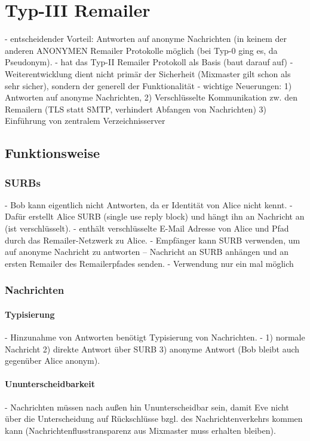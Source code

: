 \chapter{Typ-III Remailer}
- entscheidender Vorteil: Antworten auf anonyme Nachrichten (in keinem der anderen ANONYMEN Remailer Protokolle möglich (bei Typ-0 ging es, da Pseudonym).
- hat das Typ-II Remailer Protokoll als Basis (baut darauf auf)
- Weiterentwicklung dient nicht primär der Sicherheit (Mixmaster gilt schon als sehr sicher), sondern der generell der Funktionalität
- wichtige Neuerungen: 1) Antworten auf anonyme Nachrichten, 2) Verschlüsselte Kommunikation zw. den Remailern (TLS statt SMTP, verhindert Abfangen von Nachrichten) 3) Einführung von zentralem Verzeichnisserver

\section{Funktionsweise}
\subsection{SURBs}
- Bob kann eigentlich nicht Antworten, da er Identität von Alice nicht kennt.
- Dafür erstellt Alice SURB (single use reply block) und hängt ihn an Nachricht an (ist verschlüsselt).
- enthält verschlüsselte E-Mail Adresse von Alice und Pfad durch das Remailer-Netzwerk zu Alice.
- Empfänger kann SURB verwenden, um auf anonyme Nachricht zu antworten
-- Nachricht an SURB anhängen und an ersten Remailer des Remailerpfades senden.
- Verwendung nur ein mal möglich

\subsection{Nachrichten}
\subsubsection{Typisierung}
- Hinzunahme von Antworten benötigt Typisierung von Nachrichten.
- 1) normale Nachricht 2) direkte Antwort über SURB 3) anonyme Antwort (Bob bleibt auch gegenüber Alice anonym).

\subsubsection{Ununterscheidbarkeit}
- Nachrichten müssen nach außen hin Ununterscheidbar sein, damit Eve nicht über die Unterscheidung auf Rückschlüsse bzgl. des Nachrichtenverkehrs kommen kann (Nachrichtenflusstransparenz aus Mixmaster muss erhalten bleiben).

